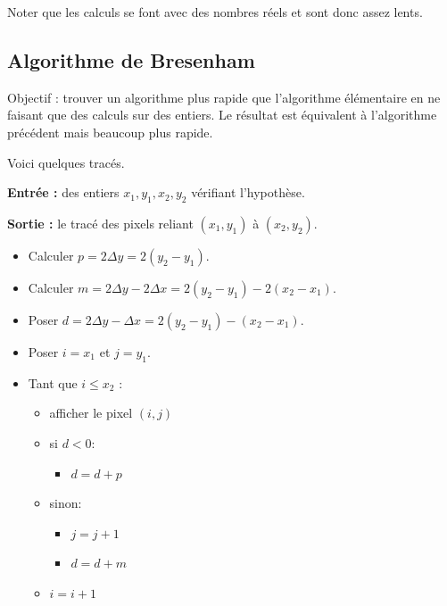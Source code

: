 \documentclass[11pt,class=report,crop=false]{standalone}
\begin{document}
Noter que les calculs se font avec des nombres réels et sont donc assez lents.

 

\subsection{Algorithme de Bresenham}


Objectif : trouver un algorithme plus rapide que l'algorithme élémentaire en ne faisant que des calculs sur des entiers. Le résultat est équivalent à l'algorithme précédent mais beaucoup plus rapide.

Voici quelques tracés.



\begin{algorithme}

\textbf{Entrée :} des entiers $x_1, y_1, x_2, y_2$ vérifiant l'hypothèse.

\textbf{Sortie :} le tracé des pixels reliant $(x_1,y_1)$ à $(x_2,y_2)$.

\begin{itemize}
	\item Calculer $p = 2\Delta y = 2(y_2-y_1)$.
	\item Calculer $m = 2\Delta y - 2 \Delta x = 2(y_2-y_1) -2(x_2-x_1)$.
	\item Poser $d = 2\Delta y - \Delta x = 2(y_2-y_1) - (x_2-x_1)$.
	
	\item Poser $i = x_1$ et $j = y_1$.
	
	\item Tant que $i \le x_2$ :
	\begin{itemize}
		\item afficher le pixel $(i,j)$
		
		\item 
		si $d < 0$:
		    \begin{itemize}
			\item $d = d+p$
			\end{itemize}
		\item sinon:
		    \begin{itemize}		
			\item $j=j+1$ 
			\item $d=d+m$	
			\end{itemize}					
		\item $i = i + 1$
	\end{itemize}
\end{itemize}
\end{algorithme}
\end{document}

